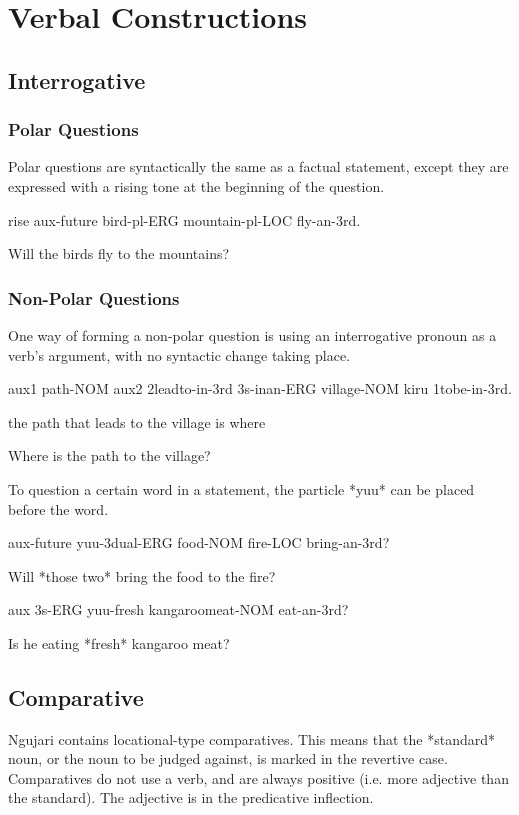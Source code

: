 \section{Verbal Constructions}

\subsection{Interrogative}

\subsubsection{Polar Questions}

Polar questions are syntactically the same as a factual statement, except they
are expressed with a rising tone at the beginning of the question.

rise aux-future bird-pl-ERG mountain-pl-LOC fly-an-3rd.

Will the birds fly to the mountains?

\subsubsection{Non-Polar Questions}

One way of forming a non-polar question is using an interrogative pronoun as a
verb's argument, with no syntactic change taking place.

aux1 path-NOM aux2 2leadto-in-3rd 3s-inan-ERG village-NOM kiru 1tobe-in-3rd.

the path that leads to the village is where

Where is the path to the village?

To question a certain word in a statement, the particle *yuu* can be placed
before the word.

aux-future yuu-3dual-ERG food-NOM fire-LOC bring-an-3rd?

Will *those two* bring the food to the fire?

aux 3s-ERG yuu-fresh kangaroomeat-NOM eat-an-3rd?

Is he eating *fresh* kangaroo meat?

\subsection{Comparative}

Ngujari contains locational-type comparatives. This means that the *standard*
noun, or the noun to be judged against, is marked in the revertive case.
Comparatives do not use a verb, and are always positive (i.e. more adjective
than the standard). The adjective is in the predicative inflection.

